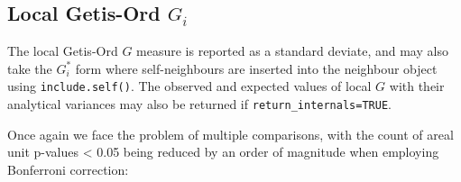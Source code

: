 \documentclass[]{book}
\newenvironment{Shaded}{\begin{snugshade}}{\end{snugshade}}
\newcommand{\CommentTok}[1]{\textcolor[rgb]{0.56,0.35,0.01}{\textit{#1}}}
\newcommand{\ControlFlowTok}[1]{\textcolor[rgb]{0.13,0.29,0.53}{\textbf{#1}}}
\newcommand{\DataTypeTok}[1]{\textcolor[rgb]{0.13,0.29,0.53}{#1}}
\newcommand{\DecValTok}[1]{\textcolor[rgb]{0.00,0.00,0.81}{#1}}
\newcommand{\KeywordTok}[1]{\textcolor[rgb]{0.13,0.29,0.53}{\textbf{#1}}}
\newcommand{\NormalTok}[1]{#1}
\newcommand{\OperatorTok}[1]{\textcolor[rgb]{0.81,0.36,0.00}{\textbf{#1}}}
\newcommand{\OtherTok}[1]{\textcolor[rgb]{0.56,0.35,0.01}{#1}}
\newcommand{\StringTok}[1]{\textcolor[rgb]{0.31,0.60,0.02}{#1}}
\begin{document}
\hypertarget{local-getis-ord-g_i}{%
\subsection{\texorpdfstring{Local Getis-Ord \(G_i\)}{Local Getis-Ord G\_i}}\label{local-getis-ord-g_i}}

The local Getis-Ord \(G\) measure is reported as a standard deviate, and may also take the \(G^*_i\) form where self-neighbours are inserted into the neighbour object using \texttt{include.self()}. The observed and expected values of local \(G\) with their analytical variances may also be returned if \texttt{return\_internals=TRUE}.

\begin{Shaded}
\end{Shaded}

Once again we face the problem of multiple comparisons, with the count of areal unit p-values \textless{} 0.05 being reduced by an order of magnitude when employing Bonferroni correction:

\begin{Shaded}
\end{Shaded}
\end{document}
